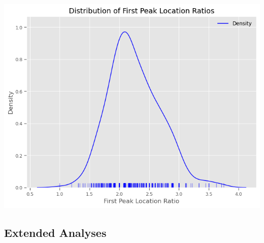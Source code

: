 \documentclass[
  11pt,
  letterpaper,
  DIV=11,
  numbers=noendperiod]{scrartcl}
\begin{document}
\includegraphics{analysis_files/figure-pdf/cell-44-output-1.png}

\subsection{Extended Analyses}\label{extended-analyses}
\end{document}
